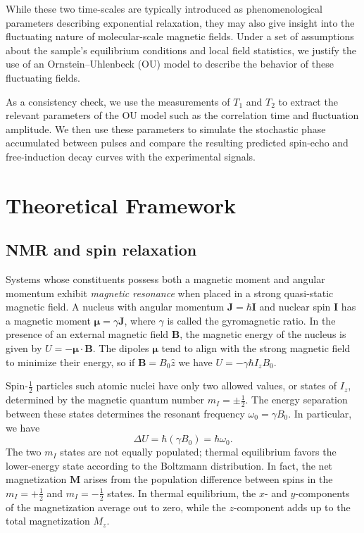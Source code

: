\documentclass[%
 reprint,
 amsmath,amssymb,
 aps,
]{revtex4-2}
\begin{document}
While these two time-scales are typically introduced as phenomenological parameters describing exponential relaxation, they may also give insight into the fluctuating nature of molecular-scale magnetic fields. Under a set of assumptions about the sample's equilibrium conditions and local field statistics, we justify the use of an Ornstein--Uhlenbeck (OU) model to describe the behavior of these fluctuating fields.

As a consistency check, we use the measurements of $T_1$ and $T_2$ to extract the relevant parameters of the OU model such as the correlation time and fluctuation amplitude. We then use these parameters to simulate the stochastic phase accumulated between pulses and compare the resulting predicted spin-echo and free-induction decay curves with the experimental signals.

\section{Theoretical Framework}
\label{sec:framework}

\subsection{NMR and spin relaxation}
\label{sec:nmr_relaxation}

Systems whose constituents possess both a magnetic moment and angular momentum exhibit \textit{magnetic resonance} when placed in a strong quasi-static magnetic field. A nucleus with angular momentum $\mathbf{J}=\hbar\mathbf{I}$ and nuclear spin $\mathbf{I}$ has a magnetic moment $\boldsymbol{\mu} = \gamma\mathbf{J}$, where $\gamma$ is called the gyromagnetic ratio. In the presence of an external magnetic field $\mathbf{B}$, the magnetic energy of the nucleus is given by $U = -\boldsymbol{\mu}\cdot\mathbf{B}$. The dipoles $\boldsymbol{\mu}$ tend to align with the strong magnetic field to minimize their energy, so if $\mathbf{B}=B_0 \hat{z}$ we have $U=-\gamma\hbar I_z B_0$.

Spin-$\tfrac{1}{2}$ particles such atomic nuclei have only two allowed values, or states of $I_z$, determined by the magnetic quantum number $m_I = \pm \tfrac{1}{2}$. The energy separation between these states determines the resonant frequency $\omega_0 = \gamma B_0$. In particular, we have
\begin{equation*}
    \Delta U = \hbar \left(\gamma B_0\right) = \hbar\omega_0.
\end{equation*}
The two $m_I$ states are not equally populated; thermal equilibrium favors the lower-energy state according to the Boltzmann distribution. In fact, the net magnetization $\mathbf{M}$ arises from the population difference between spins in the $m_I = +\tfrac{1}{2}$ and $m_I = -\tfrac{1}{2}$ states. In thermal equilibrium, the $x$- and $y$-components of the magnetization average out to zero, while the $z$-component adds up to the total magnetization $M_{z}$.
\end{document}
